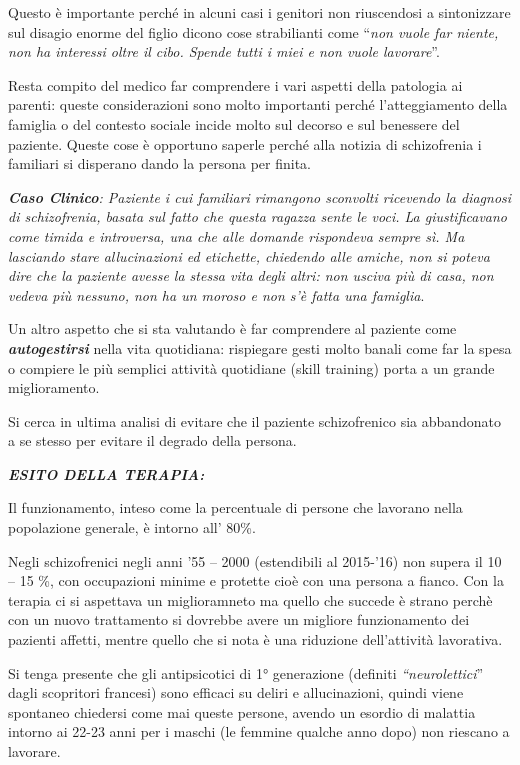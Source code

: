 \documentclass[]{article}
\begin{document}
Questo è importante perché in alcuni casi i genitori non riuscendosi a
sintonizzare sul disagio enorme del figlio dicono cose strabilianti come
``\emph{non vuole far niente, non ha interessi oltre il cibo. Spende
tutti i miei e non vuole lavorare}''.

Resta compito del medico far comprendere i vari aspetti della patologia
ai parenti: queste considerazioni sono molto importanti perché
l'atteggiamento della famiglia o del contesto sociale incide molto sul
decorso e sul benessere del paziente. Queste cose è opportuno saperle
perché alla notizia di schizofrenia i familiari si disperano dando la
persona per finita.

\emph{\textbf{Caso Clinico}: Paziente i cui familiari rimangono
sconvolti ricevendo la diagnosi di schizofrenia, basata sul fatto che
questa ragazza sente le voci. La giustificavano come timida e
introversa, una che alle domande rispondeva sempre sì. Ma lasciando
stare allucinazioni ed etichette, chiedendo alle amiche, non si poteva
dire che la paziente avesse la stessa vita degli altri: non usciva più
di casa, non vedeva più nessuno, non ha un moroso e non s'è fatta una
famiglia}.

Un altro aspetto che si sta valutando è far comprendere al paziente come
\textbf{\emph{autogestirsi}} nella vita quotidiana: rispiegare gesti
molto banali come far la spesa o compiere le più semplici attività
quotidiane (skill training) porta a un grande miglioramento.

Si cerca in ultima analisi di evitare che il paziente schizofrenico sia
abbandonato a se stesso per evitare il degrado della persona.

\textbf{\emph{ESITO DELLA TERAPIA:}}

Il funzionamento, inteso come la percentuale di persone che lavorano
nella popolazione generale, è intorno all' 80\%.

Negli schizofrenici negli anni '55 -- 2000 (estendibili al 2015-'16) non
supera il 10 -- 15 \%, con occupazioni minime e protette cioè con una
persona a fianco. Con la terapia ci si aspettava un miglioramneto ma
quello che succede è strano perchè con un nuovo trattamento si dovrebbe
avere un migliore funzionamento dei pazienti affetti, mentre quello che
si nota è una riduzione dell'attività lavorativa.

Si tenga presente che gli antipsicotici di 1° generazione (definiti
\emph{``neurolettici}'' dagli scopritori francesi) sono efficaci su
deliri e allucinazioni, quindi viene spontaneo chiedersi come mai queste
persone, avendo un esordio di malattia intorno ai 22-23 anni per i
maschi (le femmine qualche anno dopo) non riescano a lavorare.
\end{document}
